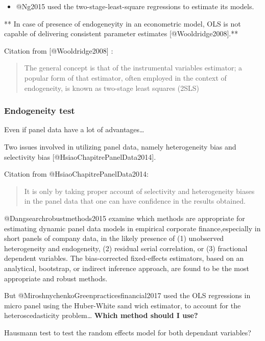 \documentclass[]{article}
\providecommand{\tightlist}{%
  \setlength{\itemsep}{0pt}\setlength{\parskip}{0pt}}
\begin{document}
\begin{itemize}
\tightlist
\item
  @Ng2015 used the two-stage-least-square regressions to estimate its
  models.
\end{itemize}

** In case of presence of endogeneyity in an econometric model, OLS is
not capable of delivering consistent parameter estimates
{[}@Wooldridge2008{]}.**

Citation from {[}@Wooldridge2008{]} :

\begin{quote}
The general concept is that of the instrumental variables estimator; a
popular form of that estimator, often employed in the context of
endogeneity, is known as two-stage least squares (2SLS)
\end{quote}

\subsubsection{Endogeneity test}\label{endogeneity-test}

Even if panel data have a lot of advantages\ldots{}

Two issues involved in utilizing panel data, namely heterogeneity bias
and selectivity bias {[}@HsiaoChapitrePanelData2014{]}.

Citation from @HsiaoChapitrePanelData2014:

\begin{quote}
It is only by taking proper account of selectivity and heterogeneity
biases in the panel data that one can have confidence in the results
obtained.
\end{quote}

@Dangsearchrobustmethods2015 examine which methods are appropriate for
estimating dynamic panel data models in empirical corporate
finance,especially in short panels of company data, in the likely
presence of (1) unobserved heterogeneity and endogeneity, (2) residual
serial correlation, or (3) fractional dependent variables. The
bias-corrected fixed-effects estimators, based on an analytical,
bootstrap, or indirect inference approach, are found to be the most
appropriate and robust methods.

But @MiroshnychenkoGreenpracticesfinancial2017 used the OLS regressions
in micro panel using the Huber-White sand wich estimator, to account for
the heteroscedasticity problem\ldots{} \textbf{Which method should I
use?}

Hausmann test to test the random effects model for both dependant
variables?
\end{document}

